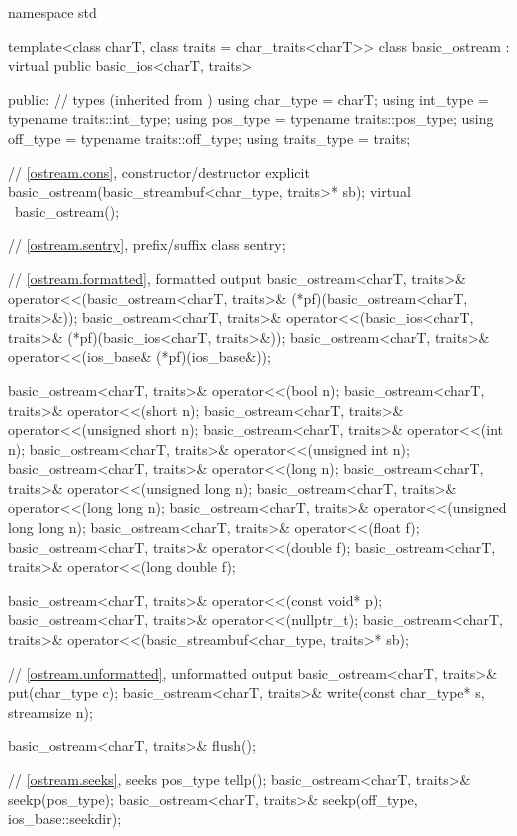 \begin{codeblock}
namespace std {
  template<class charT, class traits = char_traits<charT>>
  class basic_ostream : virtual public basic_ios<charT, traits> {
  public:
    // types (inherited from )
    using char_type   = charT;
    using int_type    = typename traits::int_type;
    using pos_type    = typename traits::pos_type;
    using off_type    = typename traits::off_type;
    using traits_type = traits;

    // \ref{ostream.cons}, constructor/destructor
    explicit basic_ostream(basic_streambuf<char_type, traits>* sb);
    virtual ~basic_ostream();

    // \ref{ostream.sentry}, prefix/suffix
    class sentry;

    // \ref{ostream.formatted}, formatted output
    basic_ostream<charT, traits>&
      operator<<(basic_ostream<charT, traits>& (*pf)(basic_ostream<charT, traits>&));
    basic_ostream<charT, traits>&
      operator<<(basic_ios<charT, traits>& (*pf)(basic_ios<charT, traits>&));
    basic_ostream<charT, traits>&
      operator<<(ios_base& (*pf)(ios_base&));

    basic_ostream<charT, traits>& operator<<(bool n);
    basic_ostream<charT, traits>& operator<<(short n);
    basic_ostream<charT, traits>& operator<<(unsigned short n);
    basic_ostream<charT, traits>& operator<<(int n);
    basic_ostream<charT, traits>& operator<<(unsigned int n);
    basic_ostream<charT, traits>& operator<<(long n);
    basic_ostream<charT, traits>& operator<<(unsigned long n);
    basic_ostream<charT, traits>& operator<<(long long n);
    basic_ostream<charT, traits>& operator<<(unsigned long long n);
    basic_ostream<charT, traits>& operator<<(float f);
    basic_ostream<charT, traits>& operator<<(double f);
    basic_ostream<charT, traits>& operator<<(long double f);

    basic_ostream<charT, traits>& operator<<(const void* p);
    basic_ostream<charT, traits>& operator<<(nullptr_t);
    basic_ostream<charT, traits>& operator<<(basic_streambuf<char_type, traits>* sb);

    // \ref{ostream.unformatted}, unformatted output
    basic_ostream<charT, traits>& put(char_type c);
    basic_ostream<charT, traits>& write(const char_type* s, streamsize n);

    basic_ostream<charT, traits>& flush();

    // \ref{ostream.seeks}, seeks
    pos_type tellp();
    basic_ostream<charT, traits>& seekp(pos_type);
    basic_ostream<charT, traits>& seekp(off_type, ios_base::seekdir);

}}
\end{codeblock}
